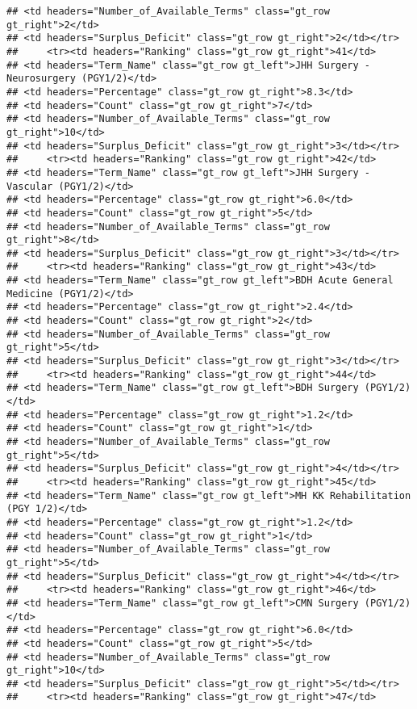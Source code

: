 \documentclass[
]{article}
\begin{document}
\begin{verbatim}
## <td headers="Number_of_Available_Terms" class="gt_row gt_right">2</td>
## <td headers="Surplus_Deficit" class="gt_row gt_right">2</td></tr>
##     <tr><td headers="Ranking" class="gt_row gt_right">41</td>
## <td headers="Term_Name" class="gt_row gt_left">JHH Surgery - Neurosurgery (PGY1/2)</td>
## <td headers="Percentage" class="gt_row gt_right">8.3</td>
## <td headers="Count" class="gt_row gt_right">7</td>
## <td headers="Number_of_Available_Terms" class="gt_row gt_right">10</td>
## <td headers="Surplus_Deficit" class="gt_row gt_right">3</td></tr>
##     <tr><td headers="Ranking" class="gt_row gt_right">42</td>
## <td headers="Term_Name" class="gt_row gt_left">JHH Surgery - Vascular (PGY1/2)</td>
## <td headers="Percentage" class="gt_row gt_right">6.0</td>
## <td headers="Count" class="gt_row gt_right">5</td>
## <td headers="Number_of_Available_Terms" class="gt_row gt_right">8</td>
## <td headers="Surplus_Deficit" class="gt_row gt_right">3</td></tr>
##     <tr><td headers="Ranking" class="gt_row gt_right">43</td>
## <td headers="Term_Name" class="gt_row gt_left">BDH Acute General Medicine (PGY1/2)</td>
## <td headers="Percentage" class="gt_row gt_right">2.4</td>
## <td headers="Count" class="gt_row gt_right">2</td>
## <td headers="Number_of_Available_Terms" class="gt_row gt_right">5</td>
## <td headers="Surplus_Deficit" class="gt_row gt_right">3</td></tr>
##     <tr><td headers="Ranking" class="gt_row gt_right">44</td>
## <td headers="Term_Name" class="gt_row gt_left">BDH Surgery (PGY1/2)</td>
## <td headers="Percentage" class="gt_row gt_right">1.2</td>
## <td headers="Count" class="gt_row gt_right">1</td>
## <td headers="Number_of_Available_Terms" class="gt_row gt_right">5</td>
## <td headers="Surplus_Deficit" class="gt_row gt_right">4</td></tr>
##     <tr><td headers="Ranking" class="gt_row gt_right">45</td>
## <td headers="Term_Name" class="gt_row gt_left">MH KK Rehabilitation (PGY 1/2)</td>
## <td headers="Percentage" class="gt_row gt_right">1.2</td>
## <td headers="Count" class="gt_row gt_right">1</td>
## <td headers="Number_of_Available_Terms" class="gt_row gt_right">5</td>
## <td headers="Surplus_Deficit" class="gt_row gt_right">4</td></tr>
##     <tr><td headers="Ranking" class="gt_row gt_right">46</td>
## <td headers="Term_Name" class="gt_row gt_left">CMN Surgery (PGY1/2)</td>
## <td headers="Percentage" class="gt_row gt_right">6.0</td>
## <td headers="Count" class="gt_row gt_right">5</td>
## <td headers="Number_of_Available_Terms" class="gt_row gt_right">10</td>
## <td headers="Surplus_Deficit" class="gt_row gt_right">5</td></tr>
##     <tr><td headers="Ranking" class="gt_row gt_right">47</td>

\end{verbatim}
\end{document}
